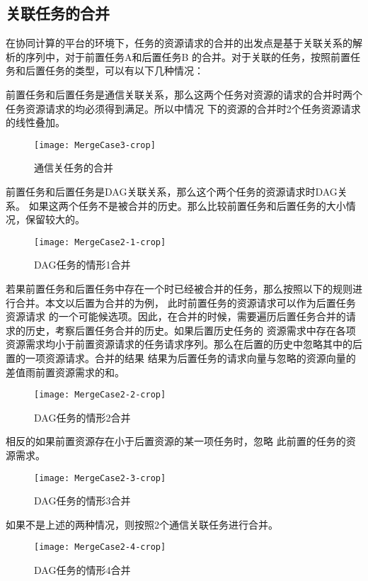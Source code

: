 \subsection{关联任务的合并}
在协同计算的平台的环境下，任务的资源请求的合并的出发点是基于关联关系的解析的序列中，对于前置任务A和后置任务B
的合并。对于关联的任务，按照前置任务和后置任务的类型，可以有以下几种情况：

前置任务和后置任务是通信关联关系，那么这两个任务对资源的请求的合并时两个任务资源请求的均必须得到满足。所以中情况
下的资源的合并时2个任务资源请求的线性叠加。
\begin{figure}[htbp]
\centering\texttt{[image: MergeCase3-crop]}
\caption{通信关任务的合并}\label{fig:MergeCase3}
\end{figure}

前置任务和后置任务是DAG关联关系，那么这个两个任务的资源请求时DAG关系。
如果这两个任务不是被合并的历史。那么比较前置任务和后置任务的大小情况，保留较大的。
\begin{figure}[htbp]
\centering\texttt{[image: MergeCase2-1-crop]}
\caption{DAG任务的情形1合并}\label{fig:MergeCase2-1}
\end{figure}
若果前置任务和后置任务中存在一个时已经被合并的任务，那么按照以下的规则进行合并。本文以后置为合并的为例，
此时前置任务的资源请求可以作为后置任务资源请求
的一个可能候选项。因此，在合并的时候，需要遍历后置任务合并的请求的历史，考察后置任务合并的历史。如果后置历史任务的
资源需求中存在各项资源需求均小于前置资源请求的任务请求序列。那么在后置的历史中忽略其中的后置的一项资源请求。合并的结果
结果为后置任务的请求向量与忽略的资源向量的差值雨前置资源需求的和。
\begin{figure}[htbp]
\centering\texttt{[image: MergeCase2-2-crop]}
\caption{DAG任务的情形2合并}\label{fig:MergeCase2-2}
\end{figure}
相反的如果前置资源存在小于后置资源的某一项任务时，忽略
此前置的任务的资源需求。
\begin{figure}[htbp]
\centering\texttt{[image: MergeCase2-3-crop]}
\caption{DAG任务的情形3合并}\label{fig:MergeCase2-3}
\end{figure}
如果不是上述的两种情况，则按照2个通信关联任务进行合并。
\begin{figure}[htbp]
\centering\texttt{[image: MergeCase2-4-crop]}
\caption{DAG任务的情形4合并}\label{fig:MergeCase2-4}
\end{figure}

